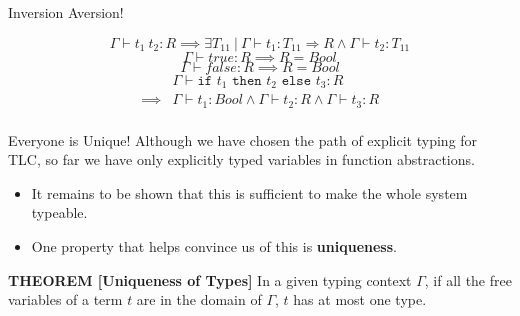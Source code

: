\documentclass[11pt]{beamer}
\begin{document}
\begin{frame}[fragile=singleslide]{Inversion Aversion!}

\begin{equation}
\Gamma \vdash t_1\:t_2 : R \implies \exists T_{11} \:|\: \Gamma \vdash t_1 : T_{11} \Rightarrow R \land \Gamma \vdash t_2 : T_{11} \tag{I-App}
\end{equation}
\vspace{0em}
\begin{equation}
\Gamma \vdash true : R \implies R = Bool \tag{I-True}
\end{equation}
\vspace{0em}
\begin{equation}
\Gamma \vdash false : R \implies R = Bool \tag{I-False}
\end{equation}
\vspace{0em}
\begin{equation}
\begin{split}
& \Gamma \vdash \texttt{if } t_1 \texttt{ then } t_2 \texttt{ else }  t_3 : R \\
\implies & \Gamma \vdash t_1 : Bool \land \Gamma \vdash t_2 : R \land \Gamma \vdash t_3 : R \\
\end{split} \tag{I-If}
\end{equation}
\end{frame}

\begin{frame}[fragile=singleslide]{Everyone is Unique!}
Although we have chosen the path of explicit typing for TLC, so far we have only explicitly typed variables in function abstractions.
\begin{itemize}
\item It remains to be shown that this is sufficient to make the whole system typeable.  
\item One property that helps convince us of this is \textbf{uniqueness}.
\end{itemize}
\vspace{1em}
\textbf{THEOREM [Uniqueness of Types]}
In a given typing context $\Gamma$, if all the free variables of a term $t$ are in the domain of $\Gamma$, $t$ has at most one type.  
\end{frame}
\end{document}

